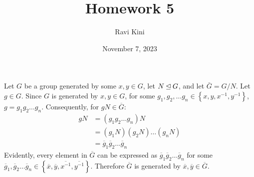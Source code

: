 \documentclass{article}
\title{Homework 5}
\author{Ravi Kini}
\date{November 7, 2023}
\begin{document}
\maketitle

\problem
Let $G$ be a group generated by some $x, y \in G$, let $N \unlhd G$, and let $\bar G = G/N$. Let $g \in G$. Since $G$ is generated by $x, y \in G$, for some $g_1, g_2, \ldots g_n \in \left\{x, y, x^{-1}, y^{-1}\right\}$, $g = g_1g_2\ldots g_n$. Consequently, for $gN \in \overline{G}$:
\begin{equation}
    \begin{split}
        gN & = \left(g_1g_2\ldots g_n\right)N \\
        & = \left(g_1N\right)\left(g_2N\right)\ldots\left(g_nN\right) \\
        & = \overline{g}_1\overline{g}_2\ldots\overline{g}_n
    \end{split}
\end{equation}
Evidently, every element in $\overline{G}$ can be expressed as $\overline{g}_1\overline{g}_2\ldots\overline{g}_n$ for some $\overline{g}_1, \overline{g}_2\ldots \overline{g}_n \in \left\{\overline{x}, \overline{y}, \overline{x^{-1}}, \overline{y^{-1}}\right\}$. Therefore $\overline{G}$ is generated by $\overline{x}, \overline{y} \in \overline{G}$.

\clearpage

\end{document}
